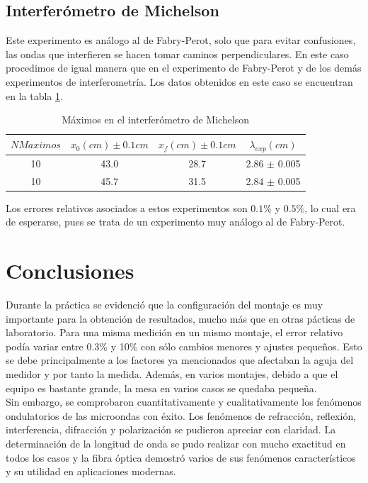 \documentclass[%
 reprint,
 amsmath,amssymb,
 aps,
]{revtex4-1}
\begin{document}
\subsection{\label{sec:level2}Interferómetro de Michelson}
Este experimento es análogo al de Fabry-Perot, solo que para evitar confusiones, las ondas que interfieren se hacen tomar caminos perpendiculares. En este caso procedimos de igual manera que en el experimento de Fabry-Perot y de los demás experimentos de interferometría. Los datos obtenidos en este caso se encuentran en la tabla \ref{table:Michelson}.\\

\begin{table}[h!]
\centering
 \begin{tabular}{|c|c|c|c|} 
 \hline
 $N Maximos$& $x_0(cm) \pm 0.1cm$ & $x_f(cm) \pm 0.1cm$ & $\lambda_{exp} (cm)$ \\ [0.5ex] 
 \hline\hline
 10 & 43.0 & 28.7 & 2.86 $\pm$ 0.005\\
 10 & 45.7 & 31.5 & 2.84 $\pm$ 0.005\\
[1ex] 
 \hline
 \end{tabular}
 \caption{Máximos en el interferómetro de Michelson}
 \label{table:Michelson}
\end{table} 

Los errores relativos asociados a estos experimentos son $0.1\%$ y $0.5\%$, lo cual era de esperarse, pues se trata de un experimento muy análogo al de Fabry-Perot.\\

\section{\label{sec:level1}Conclusiones}
 Durante la práctica se evidenció que la configuración del montaje es muy importante para la obtención de resultados, mucho más que en otras pácticas de laboratorio. Para una misma medición en un mismo montaje, el error relativo podía variar entre 0.3\% y 10\% con sólo cambios menores y ajustes pequeños. Esto se debe principalmente a los factores ya mencionados que afectaban la aguja del medidor y por tanto la medida. Además, en varios montajes, debido a que el equipo es bastante grande, la mesa en varios casos se quedaba pequeña.\\

Sin embargo, se comprobaron cuantitativamente y cualitativamente los fenómenos ondulatorios de las microondas con éxito. Los fenómenos de refracción, reflexión, interferencia, difracción y polarización se pudieron apreciar con claridad. La determinación de la longitud de onda se pudo realizar con mucho exactitud en todos los casos y la fibra óptica demostró varios de sus fenómenos característicos y su utilidad en aplicaciones modernas.\\
\end{document}
